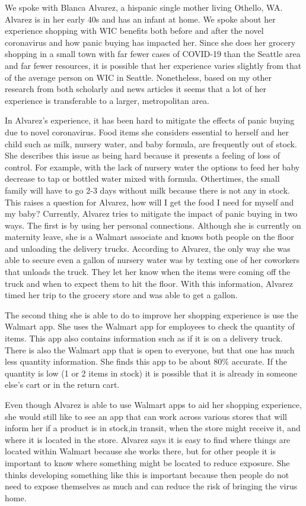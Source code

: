 \documentclass{article}
\begin{document}
We spoke with Blanca Alvarez, a hispanic single mother living Othello, WA. Alvarez is in her early 40s and has an infant at home. We spoke about her experience shopping with WIC benefits both before and after the novel coronavirus and how panic buying has impacted her. Since she does her grocery shopping in a small town with far fewer cases of COVID-19 than the Seattle area and far fewer resources, it is possible that her experience varies slightly from that of the average person on WIC in Seattle. Nonetheless, based on my other research from both scholarly and news articles it seems that a lot of her experience is transferable to a larger, metropolitan area. \par
In Alvarez’s experience, it has been hard to mitigate the effects of panic buying due to novel coronavirus. Food items she considers essential to herself and her child such as milk, nursery water, and baby formula,  are frequently out of stock. She describes this issue as being hard because it presents a feeling of loss of control. For example, with the lack of nursery water the options to feed her baby decrease to tap or bottled water mixed with formula. Othertimes, the small family will have to go 2-3 days without milk because there is not any in stock. This raises a question for Alvarez, how will I get the food I need for myself and my baby? 
Currently, Alvarez tries to mitigate the impact of panic buying in two ways.  The first is by using her personal connections. Although she is currently on maternity leave, she is a Walmart associate and knows both people on the floor and unloading the delivery trucks.  According to Alvarez, the only way she was able to secure even a gallon of nursery water was by texting one of her coworkers that unloads the truck. They let her know when the items were coming off the truck and when to expect them to hit the floor. With this information, Alvarez timed her trip to the grocery store and was able to get a gallon. \par
The second thing she is able to do to improve her shopping experience is use the Walmart app. She uses the Walmart app for employees to check the quantity of items. This app also contains information such as if it is on a delivery truck. There is also the Walmart app that is open to everyone, but that one has much less quantity information. She finds this app to be about 80\% accurate. If the quantity is low (1 or 2 items in stock) it is possible that it is already in someone else’s cart or in the return cart. \par
Even though Alvarez is able to use Walmart apps to aid her shopping experience, she would still like to see an app that can work across various stores that will inform her if a product is in stock,in transit, when the store might receive it, and where it is located in the store. Alvarez says it is easy to find where things are located within Walmart because she works there, but for other people it is important to know where something might be located to reduce exposure.  She thinks developing something like this is important because then people do not need to expose themselves as much and can reduce the risk of bringing the virus home. \par
\end{document}
